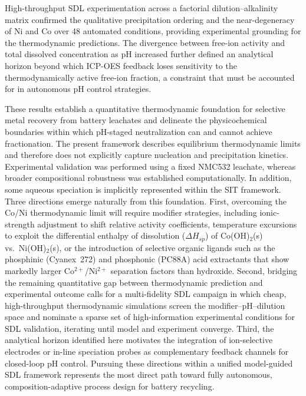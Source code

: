 \documentclass[final,2p,times]{elsarticle}
\begin{document}
High-throughput SDL experimentation across a factorial dilution--alkalinity matrix confirmed the qualitative precipitation ordering and the near-degeneracy of Ni and Co over 48 automated conditions, providing experimental grounding for the thermodynamic predictions. The divergence between free-ion activity and total dissolved concentration as pH increased further defined an analytical horizon beyond which ICP-OES feedback loses sensitivity to the thermodynamically active free-ion fraction, a constraint that must be accounted for in autonomous pH control strategies.

These results establish a quantitative thermodynamic foundation for selective metal recovery from battery leachates and delineate the physicochemical boundaries within which pH-staged neutralization can and cannot achieve fractionation. The present framework describes equilibrium thermodynamic limits and therefore does not explicitly capture nucleation and precipitation kinetics. Experimental validation was performed using a fixed NMC532 leachate, whereas broader compositional robustness was established computationally. In addition, some aqueous speciation is implicitly represented within the SIT framework. Three directions emerge naturally from this foundation. First, overcoming the Co/Ni thermodynamic limit will require modifier strategies, including ionic-strength adjustment to shift relative activity coefficients, temperature excursions to exploit the differential enthalpy of dissolution ($\Delta H_{sp}$) of Co(OH)$_2$(s) vs.\ Ni(OH)$_2$(s), or the introduction of selective organic ligands such as the phosphinic (Cyanex~272) and phosphonic (PC88A) acid extractants that show markedly larger Co$^{2+}$/Ni$^{2+}$ separation factors than hydroxide. Second, bridging the remaining quantitative gap between thermodynamic prediction and experimental outcome calls for a multi-fidelity SDL campaign in which cheap, high-throughput thermodynamic simulations screen the modifier--pH--dilution space and nominate a sparse set of high-information experimental conditions for SDL validation, iterating until model and experiment converge. Third, the analytical horizon identified here motivates the integration of ion-selective electrodes or in-line speciation probes as complementary feedback channels for closed-loop pH control. Pursuing these directions within a unified model-guided SDL framework represents the most direct path toward fully autonomous, composition-adaptive process design for battery recycling.

\end{document}
